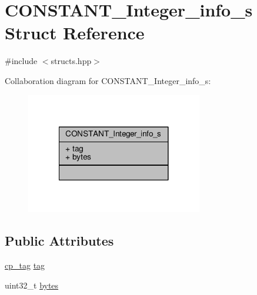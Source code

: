 \hypertarget{structCONSTANT__Integer__info__s}{\section{C\+O\+N\+S\+T\+A\+N\+T\+\_\+\+Integer\+\_\+info\+\_\+s Struct Reference}
\label{structCONSTANT__Integer__info__s}
}


{\ttfamily \#include $<$structs.\+hpp$>$}



Collaboration diagram for C\+O\+N\+S\+T\+A\+N\+T\+\_\+\+Integer\+\_\+info\+\_\+s\+:\nopagebreak
\begin{figure}[H]
\begin{center}
\leavevmode
\includegraphics[width=218pt]{structCONSTANT__Integer__info__s__coll__graph}
\end{center}
\end{figure}
\subsection*{Public Attributes}
\begin{DoxyCompactItemize}
\item 
\hyperlink{structs_8hpp_a17947ec3f3c1f2392eabd36c1ba5fec6}{cp\+\_\+tag} \hyperlink{structCONSTANT__Integer__info__s_ab64157620cc3546f13d041e230280fb9}{tag}
\item 
uint32\+\_\+t \hyperlink{structCONSTANT__Integer__info__s_adf82e6a8faf5fd5f2dbb063e4d30edf7}{bytes}
\end{DoxyCompactItemize}


